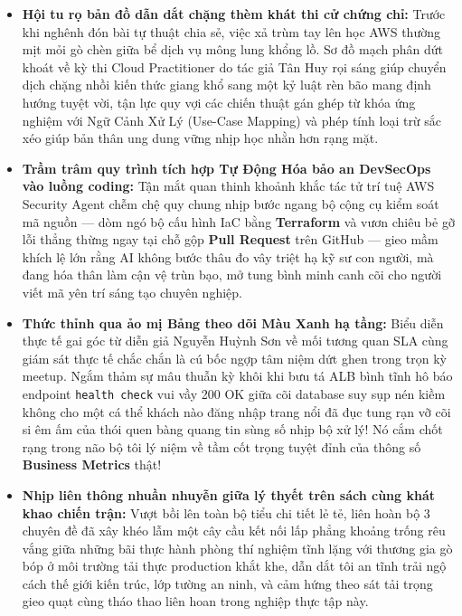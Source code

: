 \begin{itemize}
\tightlist
\item
  \textbf{Hội tu rọ bản đồ dẫn dắt chặng thèm khát thi cử chứng chỉ:}
  Trước khi nghênh đón bài tự thuật chia sẻ, việc xả trùm tay lên học
  AWS thường mịt mỏi gò chèn giữa bể dịch vụ mông lung khổng lồ. Sơ đồ
  mạch phân dứt khoát về kỳ thi Cloud Practitioner do tác giả Tân Huy
  rọi sáng giúp chuyển dịch chặng nhồi kiến thức giang khổ sang một kỷ
  luật rèn bão mang định hướng tuyệt vời, tận lực quy vợi các chiến
  thuật gán ghép từ khóa ứng nghiệm với Ngữ Cảnh Xử Lý (Use-Case
  Mapping) và phép tính loại trừ sắc xéo giúp bản thân ung dung vững
  nhịp học nhằn hơn rạng mặt.
\item
  \textbf{Trầm trâm quy trình tích hợp Tự Động Hóa bảo an DevSecOps vào
  luồng coding:} Tận mắt quan thinh khoảnh khắc tác tử trí tuệ AWS
  Security Agent chễm chệ quy chung nhịp bước ngang bộ cộng cụ kiểm soát
  mã nguồn --- dòm ngó bộ cấu hình IaC bằng \textbf{Terraform} và vươn
  chiêu bẻ gỡ lỗi thẳng thừng ngay tại chỗ gộp \textbf{Pull Request}
  trên GitHub --- gieo mầm khích lệ lớn rằng AI không bước thâu đo vây
  triệt hạ kỹ sư con người, mà đang hóa thân làm cận vệ trùn bạo, mở
  tung bình minh canh cõi cho người viết mã yên trí sáng tạo chuyên
  nghiệp.
\item
  \textbf{Thức thỉnh qua ảo mị Bảng theo dõi Màu Xanh hạ tầng:} Biểu
  diễn thực tế gai góc từ diễn giả Nguyễn Huỳnh Sơn về mối tương quan
  SLA cùng giám sát thực tế chắc chắn là cú bốc ngợp tâm niệm dứt ghen
  trong trọn kỳ meetup. Ngắm thảm sự mâu thuẫn kỳ khôi khi bưu tá ALB
  bình tĩnh hô báo endpoint \texttt{health\ check} vui vầy 200 OK giữa
  cõi database suy sụp nén kiềm không cho một cá thể khách nào đăng nhập
  trang nổi đã đục tung rạn vỡ cõi si êm ấm của thói quen bàng quang tin
  sùng số nhịp bộ xử lý! Nó cắm chốt rạng trong não bộ tôi lý niệm về
  tầm cốt trọng tuyệt đỉnh của thông số \textbf{Business Metrics} thật!
\item
  \textbf{Nhịp liên thông nhuần nhuyễn giữa lý thyết trên sách cùng khát
  khao chiến trận:} Vượt bồi lên toàn bộ tiểu chi tiết lẻ tẻ, liên hoàn
  bộ 3 chuyên đề đã xây khéo lẫm một cây cầu kết nối lấp phẳng khoảng
  trống rêu vắng giữa những bãi thực hành phòng thí nghiệm tĩnh lặng với
  thương gia gò bóp ở môi trường tải thực production khắt khe, dẫn dắt
  tôi an tĩnh trải ngộ cách thế giới kiến trúc, lớp tường an ninh, và
  cảm hứng theo sát tải trọng gieo quạt cùng tháo thao liên hoan trong
  nghiệp thực tập này.
\end{itemize}

